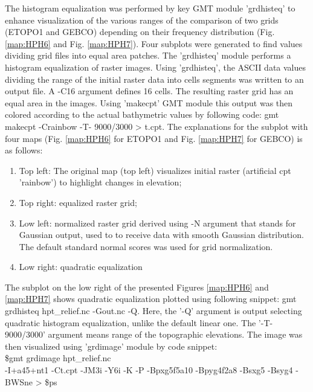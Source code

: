 \documentclass[11pt,a4paper]{report}
\begin{document}
{The histogram equalization was performed by key \ac{GMT} module 'grdhisteq' to enhance visualization of the various ranges of the comparison of two grids (\ac{ETOPO1} and \ac{GEBCO}) depending on their frequency distribution (Fig. \ref{map:HPH6} and Fig. \ref{map:HPH7}). Four subplots were generated to find values dividing grid files into equal area patches. The ’grdhisteq’ module performs a histogram equalization of raster images. Using 'grdhisteq', the \ac{ASCII} data values dividing the range of the initial raster data into cells segments was written to an output file. A -C16 argument defines 16 cells. The resulting raster grid has an equal area in the images. Using 'makecpt' \ac{GMT} module this output was then colored according to the actual bathymetric values by following code: gmt makecpt -Crainbow -T- 9000/3000 > t.cpt. The explanations for the subplot with four maps (Fig. \ref{map:HPH6} for \ac{ETOPO1} and Fig. \ref{map:HPH7} for \ac{GEBCO}) is as follows:

\begin{enumerate}
	\item Top left: The original map (top left) visualizes initial raster (artificial cpt ’rainbow’) to highlight changes in elevation;
	\item Top right: equalized raster grid;
	\item Low left: normalized raster grid derived using -N argument that stands for Gaussian output, used to to receive data with smooth Gaussian distribution. The default standard normal scores was used for grid normalization. 
	\item Low right: quadratic equalization 
\end{enumerate}

The subplot on the low right of the presented Figures \ref{map:HPH6} and \ref{map:HPH7} shows quadratic equalization plotted using following snippet: gmt grdhisteq hpt\_relief.nc -Gout.nc -Q. Here, the ’-Q’ argument is output selecting quadratic histogram equalization, unlike the default linear one. The ’-T-9000/3000’ argument means range of the topographic elevations. The image was then visualized using 'grdimage' module by code snippet: \\
	\$gmt grdimage hpt\_relief.nc \\
	-I+a45+nt1 -Ct.cpt -JM3i -Y6i -K -P -Bpxg5f5a10 -Bpyg4f2a8 -Bsxg5 -Bsyg4 -BWSne > \$ps

}
\end{document}
